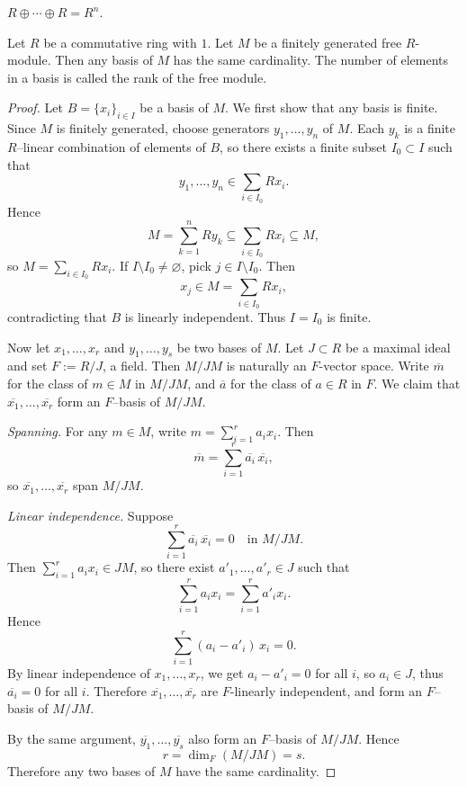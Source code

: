 \begin{example} $R \oplus \cdots \oplus R = R^{n}$.
\end{example}

\begin{theorem}
    Let $R$ be a commutative ring with $1$. Let $M$ be a finitely generated free $R$-module. Then any basis of $M$ has the same cardinality. The number of elements in a basis is called the rank of the free module.
\end{theorem}

\begin{proof}
    Let $B=\{x_i\}_{i\in I}$ be a basis of $M$.
    We first show that any basis is finite.
    Since $M$ is finitely generated, choose generators $y_1,\dots,y_n$ of $M$.
    Each $y_k$ is a finite $R$--linear combination of elements of $B$,
    so there exists a finite subset $I_0\subset I$ such that
    \[
        y_1,\dots,y_n \in \sum_{i\in I_0}Rx_i.
    \]
    Hence
    \[
        M = \sum_{k=1}^n Ry_k \subseteq \sum_{i\in I_0}Rx_i \subseteq M,
    \]
    so $M=\sum_{i\in I_0}Rx_i$.
    If $I\setminus I_0\neq\varnothing$, pick $j\in I\setminus I_0$. Then
    \[
        x_j \in M = \sum_{i\in I_0}Rx_i,
    \]
    contradicting that $B$ is linearly independent. Thus $I=I_0$ is finite.

    Now let $x_1,\dots,x_r$ and $y_1,\dots,y_s$ be two bases of $M$.
    Let $J\subset R$ be a maximal ideal and set $F:=R/J$, a field.
    Then $M/JM$ is naturally an $F$-vector space.
    Write $\overline{m}$ for the class of $m\in M$ in $M/JM$,
    and $\overline{a}$ for the class of $a\in R$ in $F$.
    We claim that $\overline{x_1},\dots,\overline{x_r}$ form an $F$--basis of $M/JM$.

    \emph{Spanning.}
    For any $m\in M$, write $m=\sum_{i=1}^r a_i x_i$. Then
    \[
        \overline{m} = \sum_{i=1}^r \overline{a_i}\,\overline{x_i},
    \]
    so $\overline{x_1},\dots,\overline{x_r}$ span $M/JM$.

    \emph{Linear independence.}
    Suppose
    \[
        \sum_{i=1}^r \overline{a_i}\,\overline{x_i} = 0 \quad \text{in } M/JM.
    \]
    Then $\sum_{i=1}^r a_i x_i \in JM$, so there exist $a'_1,\dots,a'_r\in J$ such that
    \[
        \sum_{i=1}^r a_i x_i = \sum_{i=1}^r a'_i x_i.
    \]
    Hence
    \[
        \sum_{i=1}^r (a_i - a'_i)\,x_i = 0.
    \]
    By linear independence of $x_1,\dots,x_r$, we get $a_i - a'_i = 0$ for all $i$,
    so $a_i\in J$, thus $\overline{a_i}=0$ for all $i$.
    Therefore $\overline{x_1},\dots,\overline{x_r}$ are $F$-linearly independent,
    and form an $F$--basis of $M/JM$.

    By the same argument, $\overline{y_1},\dots,\overline{y_s}$ also form an $F$--basis of $M/JM$. Hence
    \[
        r = \dim_F(M/JM) = s.
    \]
    Therefore any two bases of $M$ have the same cardinality.
\end{proof}

